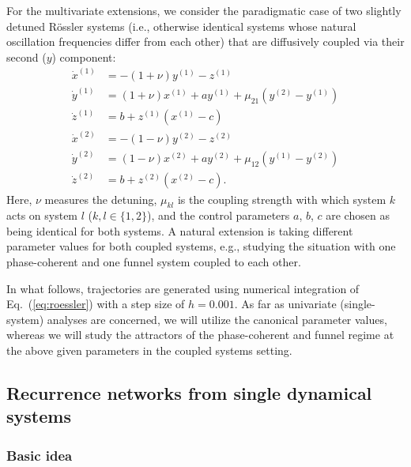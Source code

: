 \documentclass[graybox]{svmult}
\begin{document}
For the multivariate extensions, we consider the paradigmatic case of two slightly detuned R\"ossler systems (i.e., otherwise identical systems whose natural oscillation frequencies differ from each other) that are diffusively coupled via their second ($y$) component:
\begin{equation}
\begin{split}
\dot{x}^{(1)} &= -(1+\nu)y^{(1)} - z^{(1)} \\
\dot{y}^{(1)} &= (1+\nu)x^{(1)} + ay^{(1)} + \mu_{21}(y^{(2)}-y^{(1)}) \\
\dot{z}^{(1)} &= b+z^{(1)}(x^{(1)}-c) \\
\dot{x}^{(2)} &= -(1-\nu)y^{(2)} - z^{(2)} \\
\dot{y}^{(2)} &= (1-\nu)x^{(2)} + ay^{(2)} + \mu_{12}(y^{(1)}-y^{(2)}) \\
\dot{z}^{(2)} &= b+z^{(2)}(x^{(2)}-c).
\end{split}
\label{eq:coupled_roessler}
\end{equation}
\noindent
Here, $\nu$ measures the detuning, $\mu_{kl}$ is the coupling strength with which system $k$ acts on system $l$ ($k,l\in\{1,2\}$), and the control parameters $a$, $b$, $c$ are chosen as being identical for both systems. A natural extension is taking different parameter values for both coupled systems, e.g., studying the situation with one phase-coherent and one funnel system coupled to each other.

In what follows, trajectories are generated using numerical integration of Eq.~(\ref{eq:roessler}) with a step size of $h=0.001$. As far as univariate (single-system) analyses are concerned, we will utilize the canonical parameter values, whereas we will study the attractors of the phase-coherent and funnel regime at the above given parameters in the coupled systems setting.
 


\subsection{Recurrence networks from single dynamical systems}\label{sec:rn}

\subsubsection{Basic idea}\label{sec:rn_idea}
\end{document}
